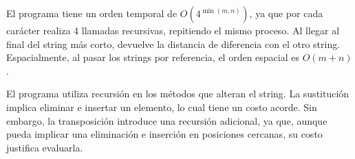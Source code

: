 El programa tiene un orden temporal de \(O(4^{\min(m, n)})\), ya que por cada carácter realiza 4 llamadas recursivas, repitiendo el mismo proceso. Al llegar al final del string más corto, devuelve la distancia de diferencia con el otro string. Espacialmente, al pasar los strings por referencia, el orden espacial es \(O(m+n)\).

El programa utiliza recursión en los métodos que alteran el string. La sustitución implica eliminar e insertar un elemento, lo cual tiene un costo acorde. Sin embargo, la transposición introduce una recursión adicional, ya que, aunque pueda implicar una eliminación e inserción en posiciones cercanas, su costo justifica evaluarla.
\newpage